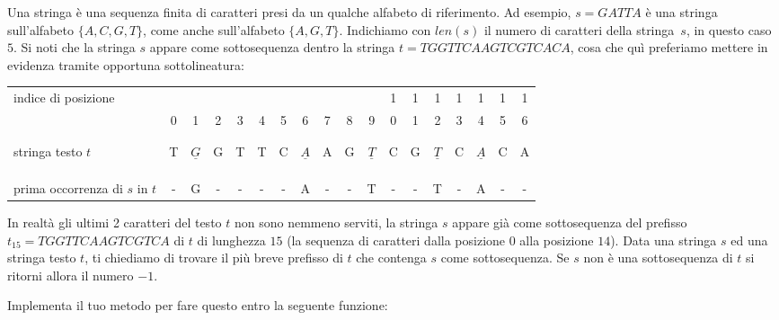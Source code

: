 \makeatletter
\renewcommand{\this@inputfilename}{\texttt{stdin}}
\renewcommand{\this@outputfilename}{\texttt{stdout}}
\makeatother

Una stringa è una sequenza finita di caratteri presi da un qualche alfabeto di riferimento. 
Ad esempio, $s=GATTA$ è una stringa sull'alfabeto $\{A,C,G,T\}$, come anche sull'alfabeto $\{A,G,T\}$.
Indichiamo con $len(s)$ il numero di caratteri della stringa~$s$, in questo caso $5$.
Si noti che la stringa $s$ appare come sottosequenza dentro la stringa $t=TGGTTCAAGTCGTCACA$, 
cosa che quì preferiamo mettere in evidenza tramite opportuna sottolineatura:\\

\renewcommand{\arraystretch}{0.2}
\begin{tabular}{l||c|c|c|c|c|c|c|c|c|c|c|c|c|c|c|c|c|}
  indice di posizione       &  & & & & & & & & & & 1&1&1&1&1&1&1 \\
                            & 0&1&2&3&4&5&6&7&8&9& 0&1&2&3&4&5&6 \\
  \hline
                            &  & & & & & & & & & &  & & & & & &  \\
                            &  & & & & & & & & & &  & & & & & &  \\  
  stringa testo $t$         & T&$\underline{G}$&G&T&T&C&$\underline{A}$&A&G&$\underline{T}$&C&G&$\underline{T}$&C&$\underline{A}$&C&A \\
                            &  & & & & & & & & & &  & & & & & &  \\
                            &  & & & & & & & & & &  & & & & & &  \\
                            &  & & & & & & & & & &  & & & & & &  \\  
  prima occorrenza di $s$ in $t$  &-&G&-&-&-&-&A&-&-&T&-&-&T&-&A&-&- \\  
\end{tabular}  
\renewcommand{\arraystretch}{1.2}  
\bigskip

In realtà gli ultimi 2 caratteri del testo $t$ non sono nemmeno serviti, la stringa 
$s$ appare già come sottosequenza del prefisso $t_{15}=TGGTTCAAGTCGTCA$ di $t$ di 
lunghezza $15$ (la sequenza di caratteri dalla posizione $0$ alla posizione $14$).
Data una stringa $s$ ed una stringa testo $t$, ti chiediamo di trovare il più breve 
prefisso di $t$ che contenga $s$ come sottosequenza.
Se $s$ non è una sottosequenza di $t$ si ritorni allora il numero $-1$.

\bigskip
\noindent
Implementa il tuo metodo per fare questo entro la seguente funzione:


